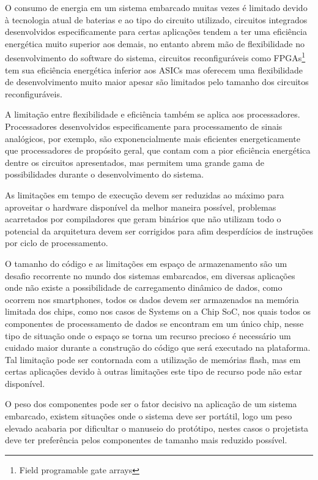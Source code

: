 O consumo de energia em um sistema embarcado muitas vezes é limitado devido à tecnologia atual de baterias e ao tipo do circuito utilizado, circuitos integrados desenvolvidos especificamente para certas aplicações tendem a ter uma eficiência energética muito superior aos demais, no entanto abrem mão de flexibilidade no desenvolvimento do software do sistema, circuitos reconfiguráveis como FPGAs\footnote{Field programable gate arrays} tem sua eficiência energética inferior aos ASICs mas oferecem uma flexibilidade de desenvolvimento muito maior apesar são limitados pelo tamanho dos circuitos reconfiguráveis.

A limitação entre flexibilidade e eficiência também se aplica aos processadores. Processadores desenvolvidos especificamente para processamento de sinais analógicos, por exemplo, são exponencialmente mais eficientes energeticamente que processadores de propósito geral, que contam com a pior eficiência energética dentre os circuitos apresentados, mas permitem uma grande gama de possibilidades durante o desenvolvimento do sistema.

As limitações em tempo de execução devem ser reduzidas ao máximo para aproveitar o hardware disponível da melhor maneira possível, problemas acarretados por compiladores que geram binários que não utilizam todo o potencial da arquitetura devem ser corrigidos para afim desperdícios de instruções por ciclo de processamento.

O tamanho do código e as limitações em espaço de armazenamento são um desafio recorrente no mundo dos sistemas embarcados, em diversas aplicações onde não existe a possibilidade de carregamento dinâmico de dados, como ocorrem nos smartphones, todos os dados devem ser armazenados na memória limitada dos chips, como nos casos de Systems on a Chip SoC, nos quais todos os componentes de processamento de dados se encontram em um único chip, nesse tipo de situação onde o espaço se torna um recurso precioso é necessário um cuidado maior durante a construção do código que será executado na plataforma. Tal limitação pode ser contornada com a utilização de memórias flash, mas em certas aplicações devido à outras limitações este tipo de recurso pode não estar disponível.

O peso dos componentes pode ser o fator decisivo na aplicação de um sistema embarcado, existem situações onde o sistema deve ser portátil, logo um peso elevado acabaria por dificultar o manuseio do protótipo, nestes casos o projetista deve ter preferência pelos componentes de tamanho mais reduzido possível.

